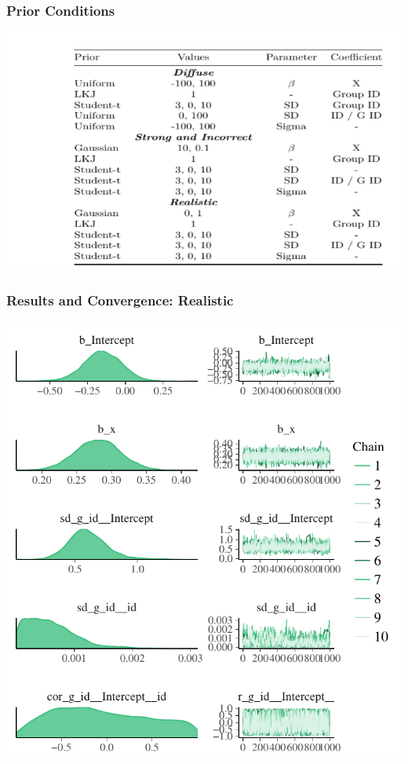 \documentclass{beamer}
\begin{document}
\begin{frame}
	\frametitle{Prior Conditions}
	\includegraphics[scale = .75]{prior_table.pdf}
\end{frame}


\begin{frame}
	\frametitle{Results and Convergence: Realistic}
	\includegraphics[scale=.5]{str_cor_fit.pdf}
\end{frame}
\end{document}
